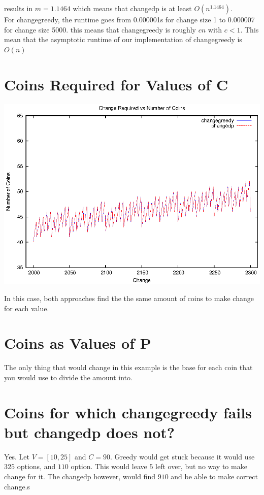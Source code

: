 \documentclass[letterpaper,10pt,titlepage]{article}
\begin{document}
results in $m = 1.1464$ which means that changedp is at least $O(n^{1.1464})$.\\

For changegreedy, the runtime goes from 0.000001s for change size 1 to 0.000007 for change size 5000. this means that changegreedy is roughly $cn$ with $c < 1$. This mean that the asymptotic runtime of our implementation of changegreedy is $O(n)$

\section{Coins Required for Values of C}
\includegraphics[width=\textwidth]{graph2.eps}

In this case, both approaches find the the same amount of coins to make change for each value.

\section{Coins as Values of P}

The only thing that would change in this example is the base for each coin that you would use to divide the amount into.

\section{Coins for which changegreedy fails but changedp does not?}

Yes. Let $V = [10, 25]$ and $C = 90$. Greedy would get stuck because it would use $3 25$ options, and $1 10$ option. This would leave $5$ left over, but no way to make change for it. The changedp however, would find $9 10$ and be able to make correct change.s
\end{document}
